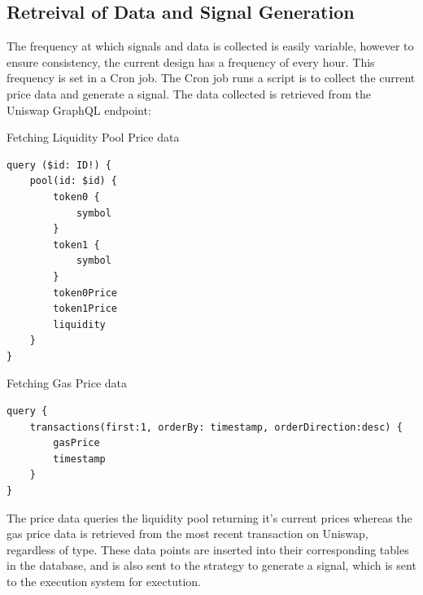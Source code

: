\subsection{Retreival of Data and Signal Generation}
The frequency at which signals and data is collected is easily variable, however to ensure consistency, the current design has a frequency of every hour. This frequency is set in a Cron job. The Cron job runs a script is to collect the current price data and generate a signal. The data collected is retrieved from the Uniswap GraphQL endpoint:
\begin{multicols}{2}
\noindent Fetching Liquidity Pool Price data
\begin{lstlisting}
query ($id: ID!) {
    pool(id: $id) {
        token0 {
            symbol
        }
        token1 {
            symbol
        }
        token0Price
        token1Price
        liquidity
    }
}
\end{lstlisting}
\columnbreak
\vspace*{3ex}
Fetching Gas Price data
\vspace*{-1ex}
\begin{lstlisting}
query {
    transactions(first:1, orderBy: timestamp, orderDirection:desc) {
        gasPrice
        timestamp
    }
}
\end{lstlisting}
\end{multicols}

\noindent The price data queries the liquidity pool returning it's current prices whereas the gas price data is retrieved from the most recent transaction on Uniswap, regardless of type. These data points are inserted into their corresponding tables in the database, and is also sent to the strategy to generate a signal, which is sent to the execution system for exectution.

